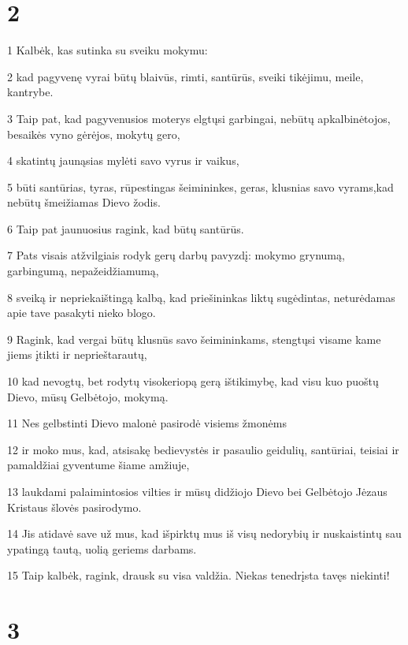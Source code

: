 \chapter{2}


\par 1 Kalbėk, kas sutinka su sveiku mokymu: 
\par 2 kad pagyvenę vyrai būtų blaivūs, rimti, santūrūs, sveiki tikėjimu, meile, kantrybe. 
\par 3 Taip pat, kad pagyvenusios moterys elgtųsi garbingai, nebūtų apkalbinėtojos, besaikės vyno gėrėjos, mokytų gero, 
\par 4 skatintų jaunąsias mylėti savo vyrus ir vaikus, 
\par 5 būti santūrias, tyras, rūpestingas šeimininkes, geras, klusnias savo vyrams,­kad nebūtų šmeižiamas Dievo žodis. 
\par 6 Taip pat jaunuosius ragink, kad būtų santūrūs. 
\par 7 Pats visais atžvilgiais rodyk gerų darbų pavyzdį: mokymo grynumą, garbingumą, nepažeidžiamumą, 
\par 8 sveiką ir nepriekaištingą kalbą, kad priešininkas liktų sugėdintas, neturėdamas apie tave pasakyti nieko blogo. 
\par 9 Ragink, kad vergai būtų klusnūs savo šeimininkams, stengtųsi visame kame jiems įtikti ir neprieštarautų, 
\par 10 kad nevogtų, bet rodytų visokeriopą gerą ištikimybę, kad visu kuo puoštų Dievo, mūsų Gelbėtojo, mokymą. 
\par 11 Nes gelbstinti Dievo malonė pasirodė visiems žmonėms 
\par 12 ir moko mus, kad, atsisakę bedievystės ir pasaulio geidulių, santūriai, teisiai ir pamaldžiai gyventume šiame amžiuje, 
\par 13 laukdami palaimintosios vilties ir mūsų didžiojo Dievo bei Gelbėtojo Jėzaus Kristaus šlovės pasirodymo. 
\par 14 Jis atidavė save už mus, kad išpirktų mus iš visų nedorybių ir nuskaistintų sau ypatingą tautą, uolią geriems darbams. 
\par 15 Taip kalbėk, ragink, drausk su visa valdžia. Niekas tenedrįsta tavęs niekinti!


\chapter{3}


